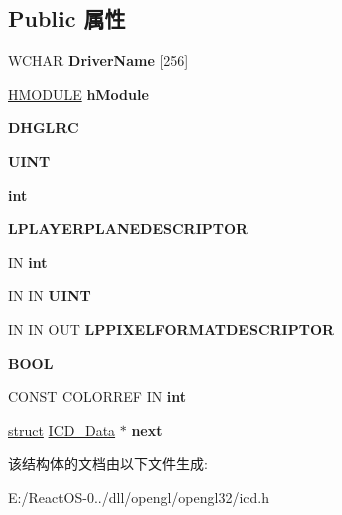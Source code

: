 \subsection*{Public 属性}
\begin{DoxyCompactItemize}
\item 
\mbox{\label{struct_i_c_d___data_aac8f5cda0c2a44abb7b469ffe7928b62}} 
W\+C\+H\+AR {\bfseries Driver\+Name} \mbox{[}256\mbox{]}
\item 
\mbox{\label{struct_i_c_d___data_a4b5b0564c5e5db57d548a8d604598f76}} 
\hyperlink{interfacevoid}{H\+M\+O\+D\+U\+LE} {\bfseries h\+Module}
\item 
\mbox{\label{struct_i_c_d___data_af917fcecc7251fc302e6c64486a70096}} 
{\bfseries D\+H\+G\+L\+RC}
\item 
\mbox{\label{struct_i_c_d___data_a8b05e22f80960bfc595dd0b8c6a24303}} 
{\bfseries U\+I\+NT}
\item 
\mbox{\label{struct_i_c_d___data_a284b4c15ca155cad70fdec832e57543a}} 
{\bfseries int}
\item 
\mbox{\label{struct_i_c_d___data_a392d2fc4ff47563f2f1e12f34ab78cf5}} 
{\bfseries L\+P\+L\+A\+Y\+E\+R\+P\+L\+A\+N\+E\+D\+E\+S\+C\+R\+I\+P\+T\+OR}
\item 
\mbox{\label{struct_i_c_d___data_aaea9debe5a74a4781d3eb895dc899f70}} 
IN {\bfseries int}
\item 
\mbox{\label{struct_i_c_d___data_aa417f11ed2ca1d6fe216657f4a25ac56}} 
IN IN {\bfseries U\+I\+NT}
\item 
\mbox{\label{struct_i_c_d___data_ad0d6aad90566d8e9186d6749fcf7228f}} 
IN IN O\+UT {\bfseries L\+P\+P\+I\+X\+E\+L\+F\+O\+R\+M\+A\+T\+D\+E\+S\+C\+R\+I\+P\+T\+OR}
\item 
\mbox{\label{struct_i_c_d___data_ae200eccb97d65766bd8070e21c307d11}} 
{\bfseries B\+O\+OL}
\item 
\mbox{\label{struct_i_c_d___data_a9590d8b4553a4a8b150c52a0721bfaed}} 
C\+O\+N\+ST C\+O\+L\+O\+R\+R\+EF IN {\bfseries int}
\item 
\mbox{\label{struct_i_c_d___data_a8d0f548b6a8eeb8d63357da0be97793d}} 
\hyperlink{interfacestruct}{struct} \hyperlink{struct_i_c_d___data}{I\+C\+D\+\_\+\+Data} $\ast$ {\bfseries next}
\end{DoxyCompactItemize}


该结构体的文档由以下文件生成\+:\begin{DoxyCompactItemize}
\item 
E\+:/\+React\+O\+S-\/0../dll/opengl/opengl32/icd.\+h\end{DoxyCompactItemize}
